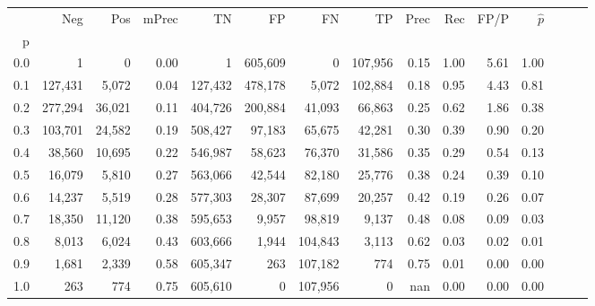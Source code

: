 \begin{tabular}{rrrrrrrrrrrrrrr}
\toprule
{} &      Neg &     Pos & mPrec &       TN &       FP &       FN &       TP &  Prec &   Rec &  FP/P & $\hat{p}$ \\
p   &          &         &       &          &          &          &          &       &       &       &           \\
\midrule
0.0 &        1 &       0 &  0.00 &        1 &  605,609 &        0 &  107,956 &  0.15 &  1.00 &  5.61 &      1.00 \\
0.1 &  127,431 &   5,072 &  0.04 &  127,432 &  478,178 &    5,072 &  102,884 &  0.18 &  0.95 &  4.43 &      0.81 \\
0.2 &  277,294 &  36,021 &  0.11 &  404,726 &  200,884 &   41,093 &   66,863 &  0.25 &  0.62 &  1.86 &      0.38 \\
0.3 &  103,701 &  24,582 &  0.19 &  508,427 &   97,183 &   65,675 &   42,281 &  0.30 &  0.39 &  0.90 &      0.20 \\
0.4 &   38,560 &  10,695 &  0.22 &  546,987 &   58,623 &   76,370 &   31,586 &  0.35 &  0.29 &  0.54 &      0.13 \\
0.5 &   16,079 &   5,810 &  0.27 &  563,066 &   42,544 &   82,180 &   25,776 &  0.38 &  0.24 &  0.39 &      0.10 \\
0.6 &   14,237 &   5,519 &  0.28 &  577,303 &   28,307 &   87,699 &   20,257 &  0.42 &  0.19 &  0.26 &      0.07 \\
0.7 &   18,350 &  11,120 &  0.38 &  595,653 &    9,957 &   98,819 &    9,137 &  0.48 &  0.08 &  0.09 &      0.03 \\
0.8 &    8,013 &   6,024 &  0.43 &  603,666 &    1,944 &  104,843 &    3,113 &  0.62 &  0.03 &  0.02 &      0.01 \\
0.9 &    1,681 &   2,339 &  0.58 &  605,347 &      263 &  107,182 &      774 &  0.75 &  0.01 &  0.00 &      0.00 \\
1.0 &      263 &     774 &  0.75 &  605,610 &        0 &  107,956 &        0 &   nan &  0.00 &  0.00 &      0.00 \\
\bottomrule
\end{tabular}
